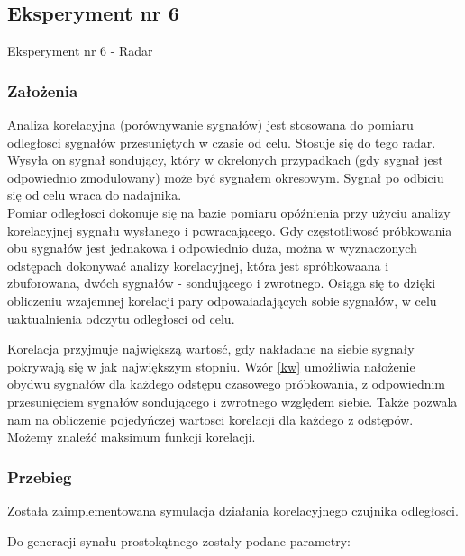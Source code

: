 \documentclass[12pt]{article}
\begin{document}

\subsection{Eksperyment nr 6}

Eksperyment nr 6 - Radar\\

\subsubsection{Założenia}
Analiza korelacyjna (porównywanie sygnałów) jest stosowana do pomiaru odległosci sygnałów przesuniętych w czasie od celu. Stosuje się do tego radar. Wysyła on sygnał sondujący, który w okrelonych przypadkach (gdy sygnał jest odpowiednio zmodulowany) może być sygnałem okresowym.
Sygnał po odbiciu się od celu wraca do nadajnika.
\\Pomiar odległosci dokonuje się na bazie pomiaru opóźnienia przy użyciu analizy korelacyjnej sygnału wysłanego i powracającego.
Gdy częstotliwosć próbkowania obu sygnałów jest jednakowa i odpowiednio duża, można w wyznaczonych odstępach dokonywać analizy korelacyjnej, która jest spróbkowaana i zbuforowana, dwóch sygnałów -  sondującego i zwrotnego. Osiąga się to dzięki obliczeniu wzajemnej korelacji pary odpowaiadających sobie sygnałów, w celu uaktualnienia odczytu odległosci od celu. 

Korelacja przyjmuje największą wartosć, gdy nakładane na siebie sygnały pokrywają się w jak największym stopniu. Wzór \ref{kw} umożliwia nałożenie obydwu
sygnałów dla każdego odstępu czasowego próbkowania, z odpowiednim przesunięciem sygnałów sondującego i zwrotnego względem siebie. Także pozwala nam na obliczenie pojedyńczej wartosci korelacji dla każdego z odstępów. Możemy znaleźć maksimum funkcji korelacji. 
 

\subsubsection{Przebieg}
Została zaimplementowana symulacja działania korelacyjnego czujnika odległosci.

Do generacji synału prostokątnego zostały podane parametry:
\end{document}
